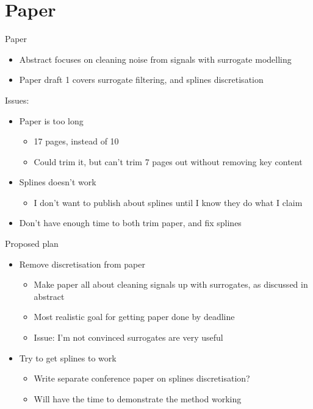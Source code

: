 \documentclass[presentation]{beamer}
\begin{document}
\section{Paper}
\label{sec:org58a6983}
\begin{frame}[label={sec:org1e5168f}]{Paper}
\begin{itemize}
\item Abstract focuses on cleaning noise from signals with surrogate modelling
\item Paper draft 1 covers surrogate filtering, and splines discretisation
\end{itemize}
\vfill      
Issues:
\begin{itemize}
\item Paper is too long
\begin{itemize}
\item 17 pages, instead of 10
\item Could trim it, but can't trim 7 pages out without removing key content
\end{itemize}
\item Splines doesn't work
\begin{itemize}
\item I don't want to publish about splines until I know they do what I claim
\end{itemize}
\item Don't have enough time to both trim paper, and fix splines
\end{itemize}
\end{frame}

\begin{frame}[label={sec:orgd26bc96}]{Proposed plan}
\begin{itemize}
\item Remove discretisation from paper
\begin{itemize}
\item Make paper all about cleaning signals up with surrogates, as discussed in abstract
\item Most realistic goal for getting paper done by deadline
\item Issue: I'm not convinced surrogates are very useful
\end{itemize}
\end{itemize}

\vfill
\begin{itemize}
\item Try to get splines to work
\begin{itemize}
\item Write separate conference paper on splines discretisation?
\item Will have the time to demonstrate the method working
\end{itemize}
\end{itemize}
\end{frame}
\end{document}
